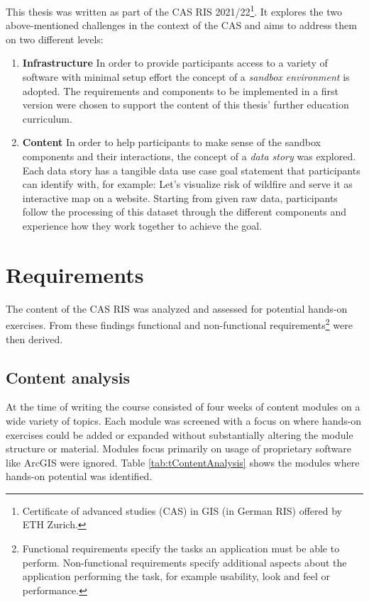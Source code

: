 \documentclass[11pt, a4paper, oneside, parskip=full-]{scrartcl}
\begin{document}
This thesis was written as part of the CAS RIS 2021/22\footnote{Certificate of
advanced studies (CAS) in GIS (in German RIS) offered by ETH Zurich.}. It
explores the two above-mentioned challenges in the context of the CAS and aims
to address them on two different levels:
\begin{enumerate}
  \item \textbf{Infrastructure} In order to provide participants access to a
  variety of software with minimal setup effort the concept of a \emph{sandbox
  environment} is adopted. The requirements and components to be implemented in
  a first version were chosen to support the content of this thesis' further
  education curriculum.
  \item \textbf{Content} In order to help participants to make sense of the
  sandbox components and their interactions, the concept of a \emph{data story}
  was explored. Each data story has a tangible data use case goal statement that
  participants can identify with, for example: Let's visualize risk of wildfire
  and serve it as interactive map on a website. Starting from given raw data,
  participants follow the processing of this dataset through the different
  components and experience how they work together to achieve the goal.
\end{enumerate}


\section{Requirements} \label{sectionrequirements} The content of the CAS RIS
was analyzed and assessed for potential hands-on exercises. From these findings
functional and non-functional requirements\footnote{Functional requirements
specify the tasks an application must be able to perform. Non-functional
requirements specify additional aspects about the application performing the
task, for example usability, look and feel or performance. } were then derived.

\subsection{Content analysis}
At the time of writing the course consisted of four weeks of content modules on
a wide variety of topics. Each module was screened with a focus on where
hands-on exercises could be added or expanded without substantially altering the
module structure or material. Modules focus primarily on usage of proprietary
software like ArcGIS were ignored. Table \ref{tab:tContentAnalysis} shows the
modules where hands-on potential was identified.
\end{document}
